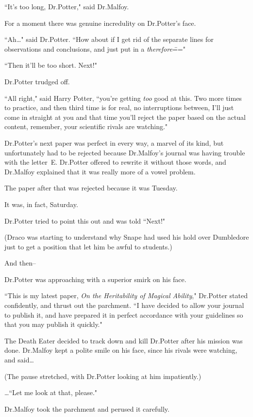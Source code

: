``It's too long, Dr.\?Potter," said Dr.\?Malfoy.

For a moment there was genuine incredulity on Dr.\?Potter's face.

``Ah{\ldots}" said Dr.\?Potter. ``How about if I get rid of the separate lines for observations and conclusions, and just put in a \emph{therefore}\==="

``Then it'll be too short. Next!"

Dr.\?Potter trudged off.

``All right," said Harry Potter, ``you're getting \emph{too} good at this. Two more times to practice, and then third time is for real, no interruptions between, I'll just come in straight at you and that time you'll reject the paper based on the actual content, remember, your scientific rivals are watching."

Dr.\?Potter's next paper was perfect in every way, a marvel of its kind, but unfortunately had to be rejected because Dr.\?Malfoy's journal was having trouble with the letter~E\@. Dr.\?Potter offered to rewrite it without those words, and Dr.\?Malfoy explained that it was really more of a vowel problem.

The paper after that was rejected because it was Tuesday.

It was, in fact, Saturday.

Dr.\?Potter tried to point this out and was told ``Next!"

(Draco was starting to understand why Snape had used his hold over Dumbledore just to get a position that let him be awful to students.)

And then\---

Dr.\?Potter was approaching with a superior smirk on his face.

``This is my latest paper, \emph{On the Heritability of Magical Ability}," Dr.\?Potter stated confidently, and thrust out the parchment. ``I have decided to allow your journal to publish it, and have prepared it in perfect accordance with your guidelines so that you may publish it quickly."

The Death Eater decided to track down and kill Dr.\?Potter after his mission was done. Dr.\?Malfoy kept a polite smile on his face, since his rivals were watching, and said{\ldots}

(The pause stretched, with Dr.\?Potter looking at him impatiently.)

{\ldots}``Let me look at that, please."

Dr.\?Malfoy took the parchment and perused it carefully.


